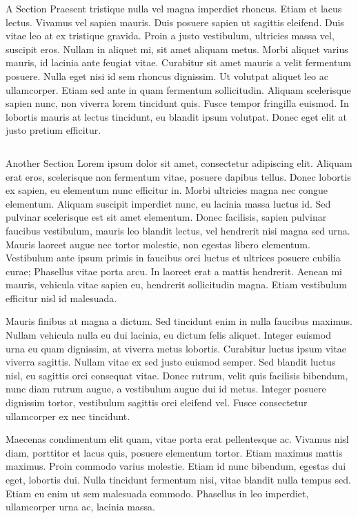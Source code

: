 \documentclass[final]{beamer}
\begin{document}
\begin{poster}
\begin{column}{\onecolwidth}
\begin{block}{A Section}
  Praesent tristique nulla vel magna imperdiet rhoncus. Etiam et lacus lectus. Vivamus vel sapien mauris. Duis posuere sapien ut sagittis eleifend. Duis vitae leo at ex tristique gravida. Proin a justo vestibulum, ultricies massa vel, suscipit eros. Nullam in aliquet mi, sit amet aliquam metus. Morbi aliquet varius mauris, id lacinia ante feugiat vitae. Curabitur sit amet mauris a velit fermentum posuere. Nulla eget nisi id sem rhoncus dignissim. Ut volutpat aliquet leo ac ullamcorper. Etiam sed ante in quam fermentum sollicitudin. Aliquam scelerisque sapien nunc, non viverra lorem tincidunt quis. Fusce tempor fringilla euismod. In lobortis mauris at lectus tincidunt, eu blandit ipsum volutpat. Donec eget elit at justo pretium efficitur.
  \cite{ipsum}
  \end{block}
\end{column}
\separator
\begin{column}{\onecolwidth}
  \begin{block}{Another Section}
  Lorem ipsum dolor sit amet, consectetur adipiscing elit. Aliquam erat eros, scelerisque non fermentum vitae, posuere dapibus tellus. Donec lobortis ex sapien, eu elementum nunc efficitur in. Morbi ultricies magna nec congue elementum. Aliquam suscipit imperdiet nunc, eu lacinia massa luctus id. Sed pulvinar scelerisque est sit amet elementum. Donec facilisis, sapien pulvinar faucibus vestibulum, mauris leo blandit lectus, vel hendrerit nisi magna sed urna. Mauris laoreet augue nec tortor molestie, non egestas libero elementum. Vestibulum ante ipsum primis in faucibus orci luctus et ultrices posuere cubilia curae; Phasellus vitae porta arcu. In laoreet erat a mattis hendrerit. Aenean mi mauris, vehicula vitae sapien eu, hendrerit sollicitudin magna. Etiam vestibulum efficitur nisl id malesuada.

  Mauris finibus at magna a dictum. Sed tincidunt enim in nulla faucibus maximus. Nullam vehicula nulla eu dui lacinia, eu dictum felis aliquet. Integer euismod urna eu quam dignissim, at viverra metus lobortis. Curabitur luctus ipsum vitae viverra sagittis. Nullam vitae ex sed justo euismod semper. Sed blandit luctus nisl, eu sagittis orci consequat vitae. Donec rutrum, velit quis facilisis bibendum, nunc diam rutrum augue, a vestibulum augue dui id metus. Integer posuere dignissim tortor, vestibulum sagittis orci eleifend vel. Fusce consectetur ullamcorper ex nec tincidunt.

  Maecenas condimentum elit quam, vitae porta erat pellentesque ac. Vivamus nisl diam, porttitor et lacus quis, posuere elementum tortor. Etiam maximus mattis maximus. Proin commodo varius molestie. Etiam id nunc bibendum, egestas dui eget, lobortis dui. Nulla tincidunt fermentum nisi, vitae blandit nulla tempus sed. Etiam eu enim ut sem malesuada commodo. Phasellus in leo imperdiet, ullamcorper urna ac, lacinia massa.
  \end{block}
\end{column}
\end{poster}
\end{document}
